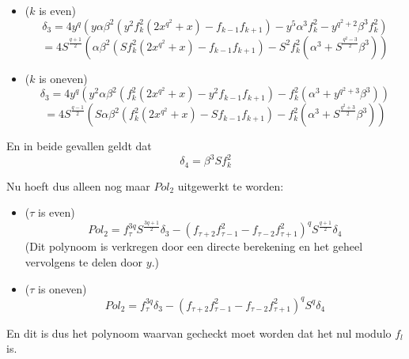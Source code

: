 \documentclass[10pt]{article}
\begin{document}
\begin{enumerate}
\begin{itemize}
\item ($k$ is even) $$\delta_3=4y^q(y\alpha\beta^2(y^2f_k^2(2x^{q^2}+x)-f_{k-1}f_{k+1})-y^5\alpha^3f_k^2-y^{q^2+2}\beta^3f_k^2)$$
$$=4S^\frac{q+1}{2}(\alpha\beta^2(Sf_k^2(2x^{q^2}+x)-f_{k-1}f_{k+1})-S^2f_k^2(\alpha^3+S^\frac{q^2-3}{2}\beta^3))$$
\item ($k$ is oneven) $$\delta_3=4y^q(y^2\alpha\beta^2(f_k^2(2x^{q^2}+x)-y^2f_{k-1}f_{k+1})-f_k^2(\alpha^3+y^{q^2+3}\beta^3))$$
$$=4S^\frac{q-1}{2}(S\alpha\beta^2(f_k^2(2x^{q^2}+x)-Sf_{k-1}f_{k+1})-f_k^2(\alpha^3+S^\frac{q^2+3}{2}\beta^3))$$
\end{itemize}
En in beide gevallen geldt dat $$\delta_4=\beta^3Sf_k^2$$

Nu hoeft dus alleen nog maar $Pol_2$ uitgewerkt te worden:
\begin{itemize}
\item ($\tau$ is even) $$Pol_2=f_\tau^{3q}S^\frac{3q+1}{2}\delta_3-(f_{\tau+2}f_{\tau-1}^2-f_{\tau-2}f_{\tau+1}^2)^qS^\frac{q+1}{2}\delta_4$$
(Dit polynoom is verkregen door een directe berekening en het geheel vervolgens te delen door $y$.)
\item ($\tau$ is oneven) $$Pol_2=f_\tau^{3q}\delta_3-(f_{\tau+2}f_{\tau-1}^2-f_{\tau-2}f_{\tau+1}^2)^qS^q\delta_4$$
\end{itemize}
En dit is dus het polynoom waarvan gecheckt moet worden dat het nul modulo $f_l$ is.
\end{enumerate}
\end{document}
